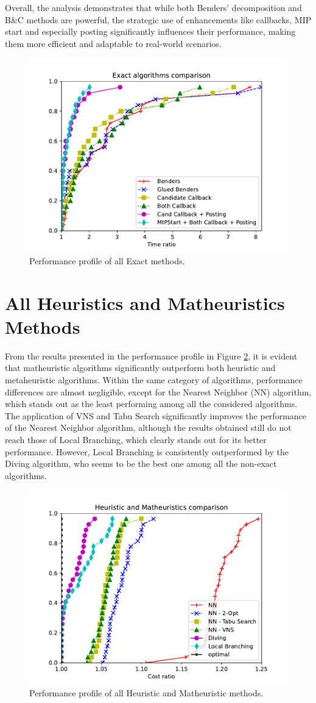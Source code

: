 Overall, the analysis demonstrates that while both Benders' decomposition and B\&C methods are powerful, the strategic use of enhancements like callbacks, MIP start and especially posting significantly influences their performance, making them more efficient and adaptable to real-world scenarios.

\begin{figure}[H]
    \centering
    \includegraphics[width=0.7\linewidth]{Immagini/exacts.pdf}
    \caption{Performance profile of all Exact methods.}
    \label{fig:exacts_comp}
\end{figure}

\section{All Heuristics and Matheuristics Methods}
From the results presented in the performance profile in Figure \ref{fig:allheur_comp}, it is evident that matheuristic algorithms significantly outperform both heuristic and metaheuristic algorithms. Within the same category of algorithms, performance differences are almost negligible, except for the Nearest Neighbor (NN) algorithm, which stands out as the least performing among all the considered algorithms. The application of VNS and Tabu Search significantly improves the performance of the Nearest Neighbor algorithm, although the results obtained still do not reach those of Local Branching, which clearly stands out for its better performance. However, Local Branching is consistently outperformed by the Diving algorithm, who seems to be the best one among all the non-exact algorithms.

\begin{figure}[H]
    \centering
    \includegraphics[width=0.7\linewidth]{Immagini/all_heur.pdf}
    \caption{Performance profile of all Heuristic and Matheuristic methods.}
    \label{fig:allheur_comp}
\end{figure}

